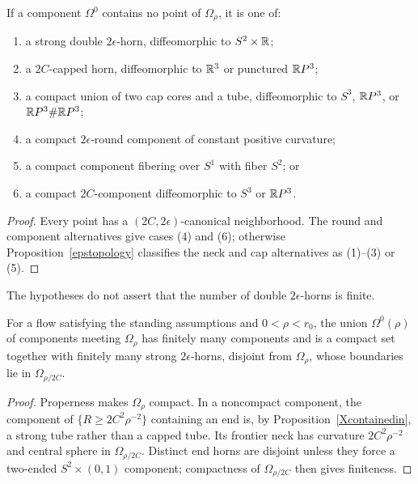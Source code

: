 \begin{lemma}
\label{lem:omega-component-classification}
If a component $\Omega^0$ contains no point of $\Omega_\rho$, it is one of:
\begin{enumerate}
\item a strong double $2\epsilon$-horn, diffeomorphic to $S^2\times\mathbb{R}$;
\item a $2C$-capped horn, diffeomorphic to $\mathbb{R}^3$ or punctured $\mathbb{R} P^3$;
\item a compact union of two cap cores and a tube, diffeomorphic to
$S^3$, $\mathbb{R} P^3$, or $\mathbb{R} P^3\#\mathbb{R} P^3$;
\item a compact $2\epsilon$-round component of constant positive curvature;
\item a compact component fibering over $S^1$ with fiber $S^2$; or
\item a compact $2C$-component diffeomorphic to $S^3$ or $\mathbb{R} P^3$.
\end{enumerate}
\end{lemma}
\begin{proof}\sketch Every
point has a $(2C,2\epsilon)$-canonical neighborhood. The round and component
alternatives give cases (4) and (6); otherwise Proposition~\ref{epstopology}
classifies the neck and cap alternatives as (1)--(3) or (5).\end{proof}
\begin{remark}
\label{rem:possibly-infinitely-many-horns}
The hypotheses do not assert that the number of double $2\epsilon$-horns is finite.
\end{remark}

\begin{lemma}
\label{lem:finitely-many-horns-meeting-omega-rho}\label{2epshorns}

For a flow satisfying the standing assumptions and $0<\rho<r_0$, the union
$\Omega^0(\rho)$ of components meeting $\Omega_\rho$ has finitely many
components and is a compact set together with finitely many strong
$2\epsilon$-horns, disjoint from $\Omega_\rho$, whose boundaries lie in
$\Omega_{\rho/2C}$.
\end{lemma}
\begin{proof}
\sketch Properness makes $\Omega_\rho$ compact. In a noncompact component,
the component of $\{R\ge2C^2\rho^{-2}\}$ containing an end is, by
Proposition~\ref{Xcontainedin}, a strong tube rather than a capped tube.
Its frontier neck has curvature $2C^2\rho^{-2}$ and central sphere in
$\Omega_{\rho/2C}$. Distinct end horns are disjoint unless they force a
two-ended $S^2\times(0,1)$ component; compactness of
$\Omega_{\rho/2C}$ then gives finiteness.\end{proof}

